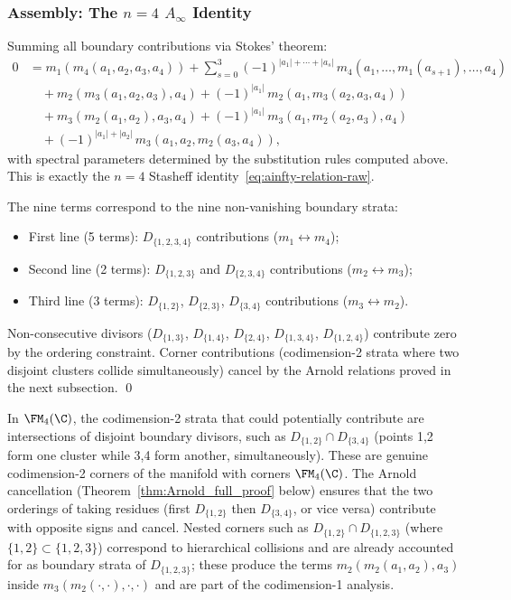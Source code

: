 \subsubsection{Assembly: The $n=4$ $A_\infty$ Identity}

\begin{proposition}[$k=4$ Stasheff identity]
\label{prop:k4_identity}
Summing all boundary contributions via Stokes' theorem:
\begin{align*}
0 &= m_1(m_4(a_1,a_2,a_3,a_4)) + \sum_{s=0}^{3} (-1)^{|a_1|+\cdots+|a_s|}\, m_4(a_1,\ldots,m_1(a_{s+1}),\ldots,a_4) \\
&\quad + m_2(m_3(a_1,a_2,a_3),a_4) + (-1)^{|a_1|}\, m_2(a_1,m_3(a_2,a_3,a_4)) \\
&\quad + m_3(m_2(a_1,a_2),a_3,a_4) + (-1)^{|a_1|}\, m_3(a_1,m_2(a_2,a_3),a_4) \\
&\quad + (-1)^{|a_1|+|a_2|}\, m_3(a_1,a_2,m_2(a_3,a_4)),
\end{align*}
with spectral parameters determined by the substitution rules computed above. This is exactly the $n=4$ Stasheff identity~\eqref{eq:ainfty-relation-raw}.

The nine terms correspond to the nine non-vanishing boundary strata:
\begin{itemize}
\item First line (5 terms): $D_{\{1,2,3,4\}}$ contributions ($m_1 \leftrightarrow m_4$);
\item Second line (2 terms): $D_{\{1,2,3\}}$ and $D_{\{2,3,4\}}$ contributions ($m_2 \leftrightarrow m_3$);
\item Third line (3 terms): $D_{\{1,2\}}$, $D_{\{2,3\}}$, $D_{\{3,4\}}$ contributions ($m_3 \leftrightarrow m_2$).
\end{itemize}
Non-consecutive divisors ($D_{\{1,3\}}$, $D_{\{1,4\}}$, $D_{\{2,4\}}$, $D_{\{1,3,4\}}$, $D_{\{1,2,4\}}$) contribute zero by the ordering constraint. Corner contributions (codimension-2 strata where two disjoint clusters collide simultaneously) cancel by the Arnold relations proved in the next subsection. \qed
\end{proposition}

\begin{remark}
\label{rem:k4_corners}
In $\FM_4(\C)$, the codimension-2 strata that could potentially contribute are intersections of disjoint boundary divisors, such as $D_{\{1,2\}} \cap D_{\{3,4\}}$ (points 1,2 form one cluster while 3,4 form another, simultaneously). These are genuine codimension-2 corners of the manifold with corners $\FM_4(\C)$. The Arnold cancellation (Theorem~\ref{thm:Arnold_full_proof} below) ensures that the two orderings of taking residues (first $D_{\{1,2\}}$ then $D_{\{3,4\}}$, or vice versa) contribute with opposite signs and cancel. Nested corners such as $D_{\{1,2\}} \cap D_{\{1,2,3\}}$ (where $\{1,2\} \subset \{1,2,3\}$) correspond to hierarchical collisions and are already accounted for as boundary strata of $D_{\{1,2,3\}}$; these produce the terms $m_2(m_2(a_1,a_2),a_3)$ inside $m_3(m_2(\cdot,\cdot),\cdot,\cdot)$ and are part of the codimension-1 analysis.
\end{remark}


